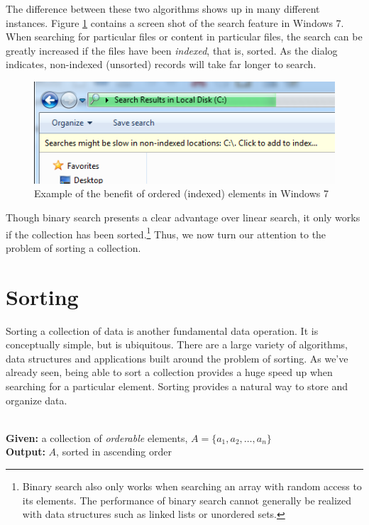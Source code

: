 The difference between these two algorithms shows up in many different instances.
Figure \ref{figure:windows7Example} contains a screen shot of the search feature
in Windows 7.  When searching for particular files or content in particular files,
the search can be greatly increased if the files have been \emph{indexed}, that
is, sorted.  As the dialog indicates, non-indexed (unsorted) records will take
far longer to search.

\begin{figure}[h]
\centering
\includegraphics[scale=0.5]{images/windows7Example}
\caption{Example of the benefit of ordered (indexed) elements in Windows 7}
\label{figure:windows7Example}
\end{figure}

Though binary search presents a clear advantage over linear search, it only works
if the collection has been sorted.\footnote{Binary search also only works when
searching an array with random access to its elements.  The performance of binary
search cannot generally be realized with data structures such as linked lists or 
unordered sets.}  Thus, we now turn our attention to the problem of sorting
a collection.

\section{Sorting}

Sorting a collection of data is another fundamental data operation.  It is
conceptually simple, but is ubiquitous.  There are a large variety of
algorithms, data structures and applications built around the problem
of sorting.  As we've already seen, being able to sort a collection provides 
a huge speed up when searching for a particular element.  Sorting provides 
a natural way to store and organize data.  

\begin{problem}[Sorting]
~\\
\textbf{Given:} a collection of \emph{orderable} elements, $A =\{a_1, a_2, \ldots, a_n\}$\\
\textbf{Output:} $A$, sorted in ascending order
\end{problem}

